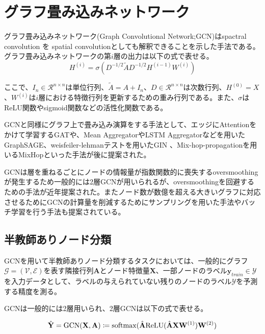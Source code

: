 \section{グラフ畳み込みネットワーク}
グラフ畳み込みネットワーク(Graph Convolutional Network;GCN)\cite{kipf2016GCN}はspactral convolution を spatial convolutionとしても解釈できることを示した手法である。
グラフ畳み込みネットワークの第$i$層の出力は以下の式で表せる。
\begin{equation}
H^{(i)} = \sigma(D^{-1/2}\tilde{A}D^{-1/2}H^{(i-1)}W^{(i)})
\end{equation}

ここで、$I_{n}\in \mathcal{R}^{n \times n}$は単位行列、$\tilde{A}=A+I_{n}$、$D \in \mathcal{R}^{n \times n}$は次数行列、$H^{(0)}=X$、$W^{(i)}$は$i$層における特徴行列を更新するための重み行列である。また、$\sigma$はReLU関数やsigmoid関数などの活性化関数である。

GCNと同様にグラフ上で畳み込み演算をする手法として、エッジにAttentionをかけて学習するGAT\cite{velivckovic2017GAT}や、Mean AggregatorやLSTM Aggregatorなどを用いたGraphSAGE\cite{hamilton2017GraphSAGE}、weisfeiler-lehmanテストを用いたGIN \cite{xu2018how_powerful_gnn}、Mix-hop-propagationを用いるMixHop\cite{sami2019mixhop}といった手法が後に提案された。

GCNは層を重ねるごとにノードの情報量が指数関数的に喪失するoversmoothingが発生するため一般的には2層GCNが用いられるが\cite{li2018deeper}、oversmoothingを回避するための手法\cite{luan2019break,chenWHDL2020gcnii}が近年提案された。またノード数が数億を超える大きいグラフに対応させるためにGCNの計算量を削減するためにサンプリングを用いた手法\cite{hamilton2017GraphSAGE, chen2018fastgcn}やバッチ学習を行う手法\cite{chiang2019cluster}も提案されている。

\subsection{半教師ありノード分類}
GCNを用いて半教師ありノード分類するタスクにおいては、一般的にグラフ$\mathcal{G} = (\mathcal{V}, \mathcal{E})$を表す隣接行列$\mathbf{A}$とノード特徴量$\mathbf{X}$、一部ノードのラベル$\boldsymbol{y}_{train} \in \mathcal{Y}$を入力データとして、ラベルの与えられていない残りのノードのラベル$\mathcal{Y}$を予測する精度を測る。

GCNは一般的には2層用いられ、2層GCNは以下の式で表せる。

\begin{align}
    \label{eq:gcn_nodecls}
    \hat{\mathbf{Y}} = \mathrm{GCN}(\mathbf{X}, \mathbf{A}) \coloneqq \mathrm{softmax} (\hat{\mathbf{A}} \mathrm{ReLU} (\hat{\mathbf{A}} \mathbf{X} \mathbf{W}^{(1)})\mathbf{W}^{(2)})
\end{align}

